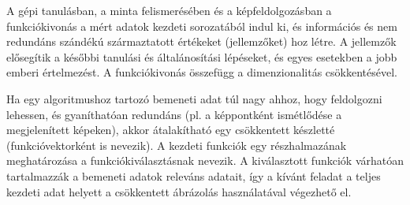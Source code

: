




A gépi tanulásban, a minta felismerésében és a képfeldolgozásban a funkciókivonás a mért adatok kezdeti sorozatából indul ki, és információs és nem redundáns szándékú származtatott értékeket (jellemzőket) hoz létre. A jellemzők elősegítik a későbbi tanulási és általánosítási lépéseket, és egyes esetekben a jobb emberi értelmezést. A funkciókivonás összefügg a dimenzionalitás csökkentésével.

Ha egy algoritmushoz tartozó bemeneti adat túl nagy ahhoz, hogy feldolgozni lehessen, és gyaníthatóan redundáns (pl. a képpontként ismétlődése a megjelenített képeken), akkor átalakítható egy csökkentett készletté (funkcióvektorként is nevezik). A kezdeti funkciók egy részhalmazának meghatározása a funkciókiválasztásnak nevezik. A kiválasztott funkciók várhatóan tartalmazzák a bemeneti adatok releváns adatait, így a kívánt feladat a teljes kezdeti adat helyett a csökkentett ábrázolás használatával végezhető el.

